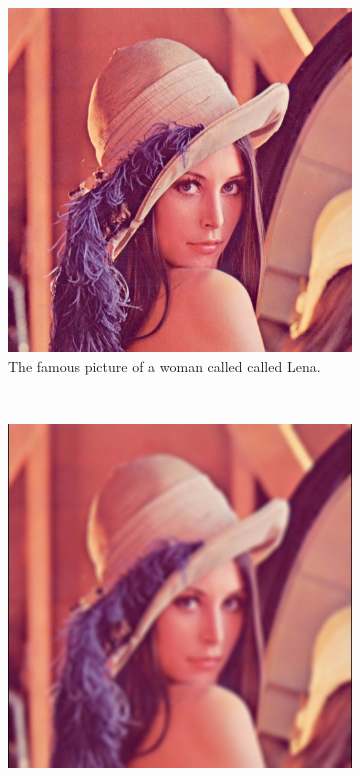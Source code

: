 \documentclass[review]{acmsiggraph}
\begin{document}
\begin{figure}
        \centering
        \begin{subfigure}[b]{0.3\textwidth}
                \centering
                \includegraphics[width=\textwidth]{images/lena512.jpg}
                \caption{The famous picture of a woman called called Lena.}
                \label{fig:lena}
        \end{subfigure}%
        ~ %
        \begin{subfigure}[b]{0.3\textwidth}
                \centering
                \includegraphics[width=\textwidth]{images/outD=3R=inf.jpg}

\end{subfigure}
\end{figure}
\end{document}
